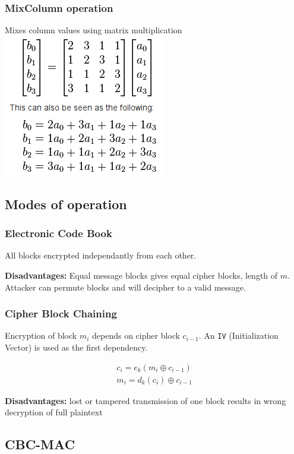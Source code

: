 \subsubsection{MixColumn operation}
Mixes column values using matrix multiplication
\includegraphics[scale=0.6]{images/4-mixcol}

\subsection{Modes of operation}

\subsubsection*{Electronic Code Book}

All blocks encrypted independantly from each other.

\textbf{Disadvantages:} Equal message blocks gives equal cipher
blocks, length of $m$. Attacker can permute blocks and will decipher
to a valid message.

\subsubsection*{Cipher Block Chaining}

Encryption of block $m_i$ depends on cipher block $c_{i-1}$. An
\texttt{IV} (Initialization Vector) is used as the first dependency.

\begin{align*}
  c_i = e_k(m_i \oplus c_{i - 1})\\
  m_i = d_k(c_i) \oplus c_{i-1}
\end{align*}

\textbf{Disadvantages:} lost or tampered transmission of one block
results in wrong decryption of full plaintext

\subsection{CBC-MAC}

